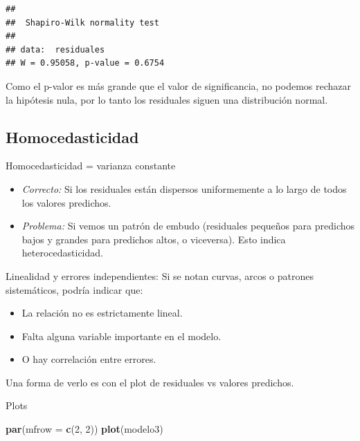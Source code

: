 \documentclass[
]{book}
\newenvironment{Shaded}{\begin{snugshade}}{\end{snugshade}}
\newcommand{\AttributeTok}[1]{\textcolor[rgb]{0.13,0.29,0.53}{#1}}
\newcommand{\DecValTok}[1]{\textcolor[rgb]{0.00,0.00,0.81}{#1}}
\newcommand{\FunctionTok}[1]{\textcolor[rgb]{0.13,0.29,0.53}{\textbf{#1}}}
\newcommand{\NormalTok}[1]{#1}
\begin{document}
\begin{verbatim}
## 
##  Shapiro-Wilk normality test
## 
## data:  residuales
## W = 0.95058, p-value = 0.6754
\end{verbatim}

Como el p-valor es más grande que el valor de significancia, no podemos rechazar la hipótesis nula, por lo tanto los residuales siguen una distribución normal.

\subsection{Homocedasticidad}\label{homocedasticidad}

Homocedasticidad = varianza constante

\begin{itemize}
\item
  \emph{Correcto:} Si los residuales están dispersos uniformemente a lo largo de todos los valores predichos.
\item
  \emph{Problema:} Si vemos un patrón de embudo (residuales pequeños para predichos bajos y grandes para predichos altos, o viceversa). Esto indica heterocedasticidad.
\end{itemize}

Linealidad y errores independientes: Si se notan curvas, arcos o patrones sistemáticos, podría indicar que:

\begin{itemize}
\item
  La relación no es estrictamente lineal.
\item
  Falta alguna variable importante en el modelo.
\item
  O hay correlación entre errores.
\end{itemize}

Una forma de verlo es con el plot de residuales vs valores predichos.

Plots

\begin{Shaded}
\begin{Highlighting}[]
\FunctionTok{par}\NormalTok{(}\AttributeTok{mfrow =} \FunctionTok{c}\NormalTok{(}\DecValTok{2}\NormalTok{, }\DecValTok{2}\NormalTok{))}
\FunctionTok{plot}\NormalTok{(modelo3)}
\end{Highlighting}
\end{Shaded}
\end{document}
